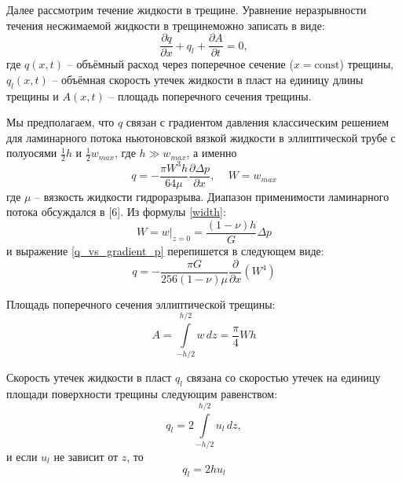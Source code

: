 \documentclass[a4paper, 11pt]{article}
\newcommand{\beq}{\begin{equation}}
\newcommand{\eeq}{\end{equation}}
\begin{document}
Далее рассмотрим течение жидкости в трещине.
Уравнение неразрывности течения несжимаемой жидкости в трещинеможно записать в виде:
\beq\label{Continuity}
\frac{\partial q}{\partial x}+q_l+\frac{\partial A}{\partial t}=0,
\eeq
где $q(x,t)$ -- объёмный расход через поперечное сечение ($x=\textrm{const}$) трещины, $q_l(x,t)$ -- объёмная скорость утечек жидкости в пласт на единицу длины трещины и $A(x,t)$ -- площадь поперечного сечения трещины.

Мы предполагаем, что $q$ связан с градиентом давления классическим решением для ламинарного потока ньютоновской вязкой жидкости в эллиптической трубе с полуосями $\frac{1}{2}h$ и $\frac{1}{2}w_{max}$, где $h\gg w_{max}$, а именно
\beq\label{q_vs_gradient_p}
q=-\frac{\pi W^3h}{64\mu}\frac{\partial\Delta p}{\partial x},\,\,\,\,\,\,\,W=w_{max}
\eeq
где $\mu$ -- вязкость жидкости гидроразрыва. Диапазон применимости ламинарного потока обсуждался в [6].
Из формулы \eqref{width}:
\beq\label{Max_W}
W=w|_{z=0}=\frac{(1-\nu)h}{G}\Delta p
\eeq
и выражение \eqref{q_vs_gradient_p} перепишется в следующем виде:
\beq\label{q_vs_w}
q=-\frac{\pi G}{256(1-\nu)\mu}\frac{\partial}{\partial x}\left(W^4\right)
\eeq

Площадь поперечного сечения эллиптической трещины:
\beq\label{A_area}
A=\int\limits_{-h/2}^{h/2}w\,dz=\frac{\pi}{4}Wh
\eeq

Скорость утечек жидкости в пласт $q_l$ связана со скоростью утечек на единицу площади поверхности трещины следующим равенством:
\beq
q_l=2\int\limits_{-h/2}^{h/2}u_l\,dz,
\eeq
и если $u_l$ не зависит от $z$, то
\beq\label{leak-offs}
q_l=2hu_l
\eeq
\end{document}
